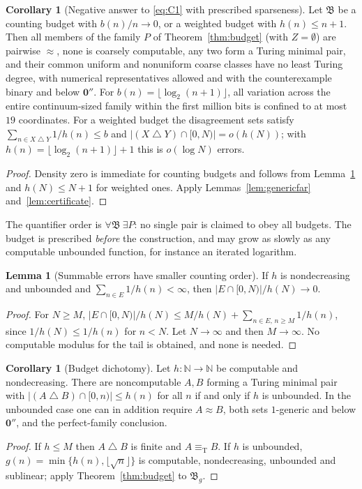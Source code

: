 \documentclass[11pt,letterpaper]{article}
\theoremstyle{definition}
\newtheorem{lemma}[definition]{Lemma}
\newtheorem{corollary}[definition]{Corollary}
\numberwithin{equation}{section}
\newcommand{\N}{\mathbb N}
\newcommand{\eqT}{\equiv_{\mathrm T}}
\newcommand{\sd}{\mathbin{\triangle}}
\newcommand{\zero}{\mathbf 0}
\newcommand{\bud}{\mathfrak B}
\newcommand{\src}[1]{\leavevmode{\sffamily\footnotesize\color{Steel}[#1]}}
\begin{document}
\begin{corollary}[Negative answer to \eqref{eq:C1} with prescribed sparseness]\label{cor:budgetC1}\src{R2, R6, R7}
Let $\bud$ be a counting budget with $b(n)/n\to0$, or a weighted budget with $h(n)\le n+1$. Then all members of the family $P$ of Theorem~\ref{thm:budget} (with $Z=\emptyset$) are pairwise $\approx$, none is coarsely computable, any two form a Turing minimal pair, and their common uniform and nonuniform coarse classes have no least Turing degree, with numerical representatives allowed and with the counterexample binary and below $\zero''$. For $b(n)=\lfloor\log_2(n+1)\rfloor$, all variation across the entire continuum-sized family within the first million bits is confined to at most $19$ coordinates. For a weighted budget the disagreement sets satisfy $\sum_{n\in X\sd Y}1/h(n)\le b$ and $|(X\sd Y)\cap[0,N)|=o(h(N))$; with $h(n)=\lfloor\log_2(n+1)\rfloor+1$ this is $o(\log N)$ errors.
\end{corollary}
\begin{proof}
Density zero is immediate for counting budgets and follows from Lemma~\ref{lem:count} and $h(N)\le N+1$ for weighted ones. Apply Lemmas~\ref{lem:genericfar} and~\ref{lem:certificate}.
\end{proof}
The quantifier order is $\forall\bud\ \exists P$: no single pair is claimed to obey all budgets. The budget is prescribed \emph{before} the construction, and may grow as slowly as any computable unbounded function, for instance an iterated logarithm.

\begin{lemma}[Summable errors have smaller counting order]\label{lem:count}\src{R7}
If $h$ is nondecreasing and unbounded and $\sum_{n\in E}1/h(n)<\infty$, then $|E\cap[0,N)|/h(N)\to0$.
\end{lemma}
\begin{proof}
For $N\ge M$, $|E\cap[0,N)|/h(N)\le M/h(N)+\sum_{n\in E,\,n\ge M}1/h(n)$, since $1/h(N)\le1/h(n)$ for $n<N$. Let $N\to\infty$ and then $M\to\infty$. No computable modulus for the tail is obtained, and none is needed.
\end{proof}

\begin{corollary}[Budget dichotomy]\label{cor:dichotomy}\src{R2, R6}
Let $h:\N\to\N$ be computable and nondecreasing. There are noncomputable $A,B$ forming a Turing minimal pair with $|(A\sd B)\cap[0,n)|\le h(n)$ for all $n$ if and only if $h$ is unbounded. In the unbounded case one can in addition require $A\approx B$, both sets $1$-generic and below $\zero''$, and the perfect-family conclusion.
\end{corollary}
\begin{proof}
If $h\le M$ then $A\sd B$ is finite and $A\eqT B$. If $h$ is unbounded, $g(n)=\min\{h(n),\lfloor\sqrt n\rfloor\}$ is computable, nondecreasing, unbounded and sublinear; apply Theorem~\ref{thm:budget} to $\bud_g$.
\end{proof}
\end{document}
